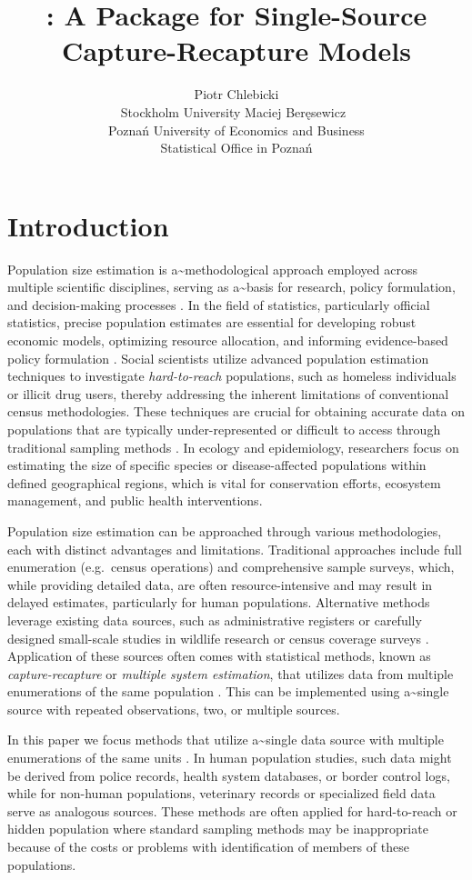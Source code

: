 \documentclass[
]{jss}
\author{
Piotr Chlebicki\\Stockholm University \And Maciej
Beręsewicz~\orcidlink{0000-0002-8281-4301}\\Poznań University of
Economics and Business\\
Statistical Office in Poznań
}
\title{\pkg{singleRcapture}: A Package for Single-Source
Capture-Recapture Models}
\newcommand{\1}{\mathcal{I}} \newcommand{\bZero}{\boldsymbol{0}}
\begin{document}
\section{Introduction}\label{introduction}

Population size estimation is a\textasciitilde methodological approach
employed across multiple scientific disciplines, serving as
a\textasciitilde basis for research, policy formulation, and
decision-making processes \citep{bohning2018capture}. In the field of
statistics, particularly official statistics, precise population
estimates are essential for developing robust economic models,
optimizing resource allocation, and informing evidence-based policy
formulation \citep[cf.][]{baffour-awuah2009}. Social scientists utilize
advanced population estimation techniques to investigate
\textit{hard-to-reach} populations, such as homeless individuals or
illicit drug users, thereby addressing the inherent limitations of
conventional census methodologies. These techniques are crucial for
obtaining accurate data on populations that are typically
under-represented or difficult to access through traditional sampling
methods \citep{vincent2022estimating}. In ecology and epidemiology,
researchers focus on estimating the size of specific species or
disease-affected populations within defined geographical regions, which
is vital for conservation efforts, ecosystem management, and public
health interventions.

Population size estimation can be approached through various
methodologies, each with distinct advantages and limitations.
Traditional approaches include full enumeration (e.g.~census operations)
and comprehensive sample surveys, which, while providing detailed data,
are often resource-intensive and may result in delayed estimates,
particularly for human populations. Alternative methods leverage
existing data sources, such as administrative registers or carefully
designed small-scale studies in wildlife research or census coverage
surveys \citep{wolter1986some, zhang2019note}. Application of these
sources often comes with statistical methods, known as
\textit{capture-recapture} or \textit{multiple system estimation}, that
utilizes data from multiple enumerations of the same population
\citep[cf.][]{dunne2024system}. This can be implemented using
a\textasciitilde single source with repeated observations, two, or
multiple sources.

In this paper we focus methods that utilize a\textasciitilde single data
source with multiple enumerations of the same units
\citep[cf.][]{ztpoisson}. In human population studies, such data might
be derived from police records, health system databases, or border
control logs, while for non-human populations, veterinary records or
specialized field data serve as analogous sources. These methods are
often applied for hard-to-reach or hidden population where standard
sampling methods may be inappropriate because of the costs or problems
with identification of members of these populations.
\end{document}
